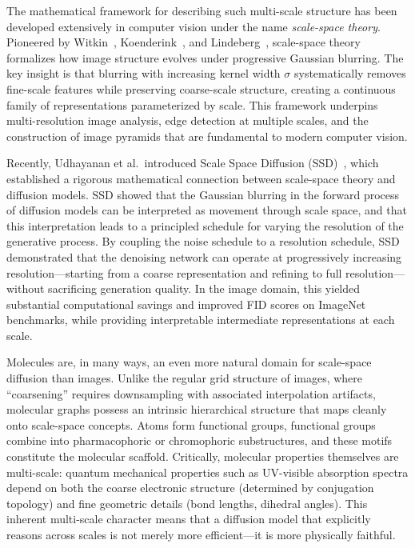 \documentclass[11pt]{article}
\begin{document}
The mathematical framework for describing such multi-scale structure has been developed extensively in computer vision under the name \emph{scale-space theory}. Pioneered by Witkin~\cite{witkin1987scalespace}, Koenderink~\cite{koenderink1984structure}, and Lindeberg~\cite{lindeberg1994scalespace}, scale-space theory formalizes how image structure evolves under progressive Gaussian blurring. The key insight is that blurring with increasing kernel width $\sigma$ systematically removes fine-scale features while preserving coarse-scale structure, creating a continuous family of representations parameterized by scale. This framework underpins multi-resolution image analysis, edge detection at multiple scales, and the construction of image pyramids that are fundamental to modern computer vision.

Recently, Udhayanan et al.\ introduced Scale Space Diffusion (SSD)~\cite{ssd2026}, which established a rigorous mathematical connection between scale-space theory and diffusion models. SSD showed that the Gaussian blurring in the forward process of diffusion models can be interpreted as movement through scale space, and that this interpretation leads to a principled schedule for varying the resolution of the generative process. By coupling the noise schedule to a resolution schedule, SSD demonstrated that the denoising network can operate at progressively increasing resolution---starting from a coarse representation and refining to full resolution---without sacrificing generation quality. In the image domain, this yielded substantial computational savings and improved FID scores on ImageNet benchmarks, while providing interpretable intermediate representations at each scale.

Molecules are, in many ways, an even more natural domain for scale-space diffusion than images. Unlike the regular grid structure of images, where ``coarsening'' requires downsampling with associated interpolation artifacts, molecular graphs possess an intrinsic hierarchical structure that maps cleanly onto scale-space concepts. Atoms form functional groups, functional groups combine into pharmacophoric or chromophoric substructures, and these motifs constitute the molecular scaffold. Critically, molecular properties themselves are multi-scale: quantum mechanical properties such as UV-visible absorption spectra depend on both the coarse electronic structure (determined by conjugation topology) and fine geometric details (bond lengths, dihedral angles). This inherent multi-scale character means that a diffusion model that explicitly reasons across scales is not merely more efficient---it is more physically faithful.
\end{document}
